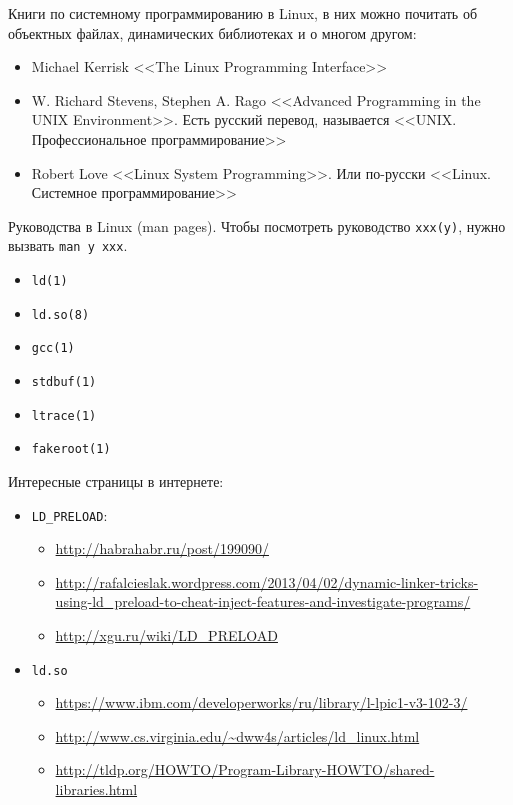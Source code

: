 \documentclass[a4paper,titlepage]{article}
\begin{document}
Книги по системному программированию в Linux, в них можно почитать об объектных
файлах, динамических библиотеках и о многом другом:

\begin{itemize}
  \item Michael Kerrisk <<The Linux Programming Interface>>
  \item W. Richard Stevens, Stephen A. Rago <<Advanced Programming in the UNIX
    Environment>>. Есть русский перевод, называется <<UNIX. Профессиональное
    программирование>>
  \item Robert Love <<Linux System Programming>>. Или по-русски
    <<Linux. Системное программирование>>
\end{itemize}

Руководства в Linux (man pages). Чтобы посмотреть руководство \texttt{xxx(y)},
нужно вызвать \texttt{man y xxx}.

\begin{itemize}
  \item \texttt{ld(1)}
  \item \texttt{ld.so(8)}
  \item \texttt{gcc(1)}
  \item \texttt{stdbuf(1)}
  \item \texttt{ltrace(1)}
  \item \texttt{fakeroot(1)}
\end{itemize}

Интересные страницы в интернете:

\begin{itemize}
\item \texttt{LD\_PRELOAD}:
  \begin{itemize}
  \item \url{http://habrahabr.ru/post/199090/}
  \item
    \url{http://rafalcieslak.wordpress.com/2013/04/02/dynamic-linker-tricks-using-ld_preload-to-cheat-inject-features-and-investigate-programs/}
  \item \url{http://xgu.ru/wiki/LD_PRELOAD}
  \end{itemize}

\item \texttt{ld.so}
  \begin{itemize}
  \item \url{https://www.ibm.com/developerworks/ru/library/l-lpic1-v3-102-3/}
  \item \url{http://www.cs.virginia.edu/~dww4s/articles/ld_linux.html}
  \item \url{http://tldp.org/HOWTO/Program-Library-HOWTO/shared-libraries.html}
  \end{itemize}
\end{itemize}
\end{document}
